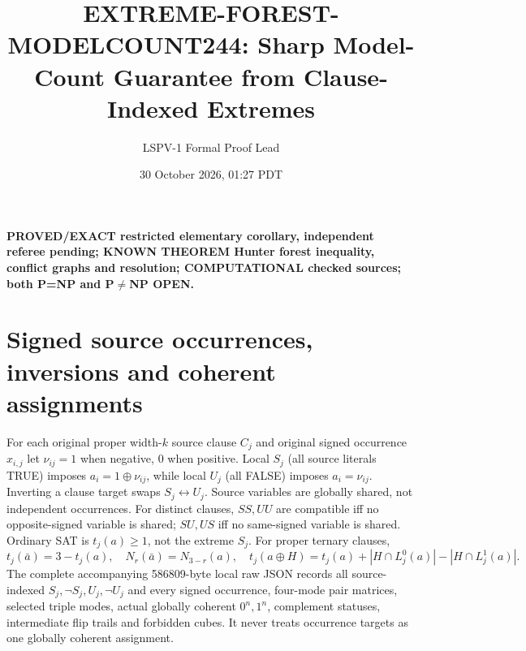 \documentclass[10pt]{article}
\title{EXTREME-FOREST-MODELCOUNT244: Sharp Model-Count Guarantee from Clause-Indexed Extremes}
\author{LSPV-1 Formal Proof Lead}
\date{30 October 2026, 01:27 PDT}
\begin{document}
\maketitle
\noindent\textbf{PROVED/EXACT restricted elementary corollary, independent referee pending; KNOWN THEOREM Hunter forest inequality, conflict graphs and resolution; COMPUTATIONAL checked sources; both P=NP and P$\ne$NP OPEN.}
\section{Signed source occurrences, inversions and coherent assignments}
For each original proper width-$k$ source clause $C_j$ and original signed occurrence $x_{i,j}$ let $\nu_{ij}=1$ when negative, $0$ when positive. Local $S_j$ (all source literals TRUE) imposes $a_i=1\oplus\nu_{ij}$, while local $U_j$ (all FALSE) imposes $a_i=\nu_{ij}$. Inverting a clause target swaps $S_j\leftrightarrow U_j$. Source variables are globally shared, not independent occurrences. For distinct clauses, $SS,UU$ are compatible iff no opposite-signed variable is shared; $SU,US$ iff no same-signed variable is shared. Ordinary SAT is $t_j(a)\ge1$, not the extreme $S_j$. For proper ternary clauses,
\[
t_j(\bar a)=3-t_j(a),\quad N_r(\bar a)=N_{3-r}(a),\quad
t_j(a\oplus H)=t_j(a)+|H\cap L_j^0(a)|-|H\cap L_j^1(a)|.
\]
The complete accompanying 586809-byte local raw JSON records all source-indexed $S_j,\neg S_j,U_j,\neg U_j$ and every signed occurrence, four-mode pair matrices, selected triple modes, actual globally coherent $0^n,1^n$, complement statuses, intermediate flip trails and forbidden cubes. It never treats occurrence targets as one globally coherent assignment.
\end{document}
